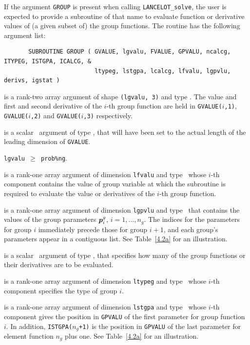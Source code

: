 \documentclass{galahad}
\newcommand{\fullpackagename}{LANC\-E\-LOT}
\newcommand{\solver}{{\tt \fullpackagename\_solve}}
\begin{document}
If the argument {\tt GROUP} is present when calling \solver, the
user is expected to provide a subroutine of that name to evaluate
function or derivative values of (a given subset of) the group functions.
The routine has the following argument list:

\def\baselinestretch{0.8}
{\tt \begin{verbatim}
       SUBROUTINE GROUP ( GVALUE, lgvalu, FVALUE, GPVALU, ncalcg, ITYPEG, ISTGPA, ICALCG, &
                          ltypeg, lstgpa, lcalcg, lfvalu, lgpvlu, derivs, igstat )
\end{verbatim} }
\def\baselinestretch{1.0}

\begin{description}

 is a rank-two \intentout array argument of
shape {\tt (lgvalu, 3)} and type \realdp.
The value and first and second derivative of the $i$-th group
function are held in
{\tt GVALUE($i$,1)},
{\tt GVALUE($i$,2)} and
{\tt GVALUE($i$,3)}
respectively.

 is a scalar \intentin\ argument of type \integer,
that will have been set to the actual length of the leading dimension
of {\tt GVALUE}.

\restriction
{\tt lgvalu $\geq$ prob\%ng}.

 is a rank-one \intentin array argument of
dimension {\tt lfvalu} and type \realdp\,
whose $i$-th component contains the value of group variable at which the
subroutine is required to evaluate the value or derivatives
of the $i$-th group function.

 is a rank-one \intentin array argument of
dimension {\tt lgpvlu}  and type \realdp\,
that contains the values of the group parameters ${\bm{p}}^g_i$, $i = 1, \ldots,
n_g$. The indices for the parameters for group $i$ immediately precede
those for group $i+1$, and each group's parameters appear in a contiguous
list. See Table~\ref{4.2a} for an illustration.

 is a scalar \intentin\ argument of type \integer,
that specifies how many of the group functions or their
derivatives are to be evaluated.

 is a rank-one \intentin array argument of
dimension {\tt ltypeg} and type \integer\,
whose $i$-th component specifies the type of group $i$.

 is a rank-one \intentin array argument of
dimension {\tt lstgpa} and type \integer\,
whose $i$-th component gives the position in
{\tt GPVALU} of the first parameter for group function $i$.  In
addition, {\tt ISTGPA($n_g$+1)} is the position in
{\tt GPVALU} of the last  parameter for element function $n_g$ plus one. See
Table~\ref{4.2a} for an illustration.


\end{description}
\end{document}
